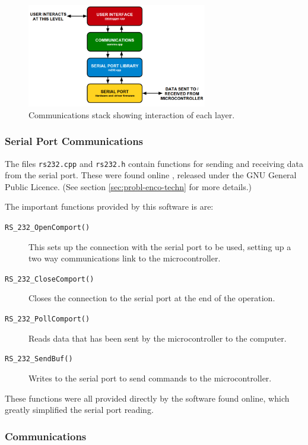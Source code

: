 \documentclass[a4paper,10pt]{article}  %
\begin{document}
\begin{figure}[!htb]
  \begin{center}
    \includegraphics[width=0.7\textwidth]{CommunicationsProtocol.png}
  \end{center}
  \caption{Communications stack showing interaction of each layer.}
  \label{fig:commsprotocol}
\end{figure}

\subsubsection{Serial Port Communications}

The files \texttt{rs232.cpp} and \texttt{rs232.h} contain functions for
sending and receiving data from the serial port. These were found
online \cite{rs232_lib}, released under the GNU General Public
Licence. (See section \ref{sec:probl-enco-techn} for more details.)

The important functions provided by this software is are:
\begin{description}
  \item[\texttt{RS\_232\_OpenComport()}]
    This sets up the connection with the serial port to be used,
    setting up a two way communications link to the microcontroller.
  \item[\texttt{RS\_232\_CloseComport()}] Closes the connection to the
    serial port at the end of the operation.
  \item[\texttt{RS\_232\_PollComport()}] Reads data that has been sent
    by the microcontroller to the computer.
  \item[\texttt{RS\_232\_SendBuf()}] Writes to the serial port to send
    commands to the microcontroller.
\end{description}

These functions were all provided directly by the software found
online, which greatly simplified the serial port reading.

\subsubsection{Communications}
\end{document}
